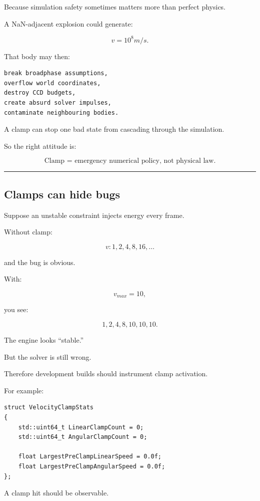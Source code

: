 Because simulation safety sometimes matters more than perfect physics.

A NaN-adjacent explosion could generate:

\[
v=10^8m/s.
\]

That body may then:

\begin{verbatim}
break broadphase assumptions,
overflow world coordinates,
destroy CCD budgets,
create absurd solver impulses,
contaminate neighbouring bodies.
\end{verbatim}

A clamp can stop one bad state from cascading through the simulation.

So the right attitude is:

\[
\boxed{
\text{Clamp = emergency numerical policy, not physical law.}
}
\]

\begin{center}\rule{0.5\linewidth}{0.5pt}\end{center}

\subsection{Clamps can hide bugs}\label{06-engine-ii-ch038-clamps-can-hide-bugs}

Suppose an unstable constraint injects energy every frame.

Without clamp:

\[
v:
1,2,4,8,16,\ldots
\]

and the bug is obvious.

With:

\[
v_{max}=10,
\]

you see:

\[
1,2,4,8,10,10,10.
\]

The engine looks ``stable.''

But the solver is still wrong.

Therefore development builds should instrument clamp activation.

For example:

\begin{verbatim}
struct VelocityClampStats
{
    std::uint64_t LinearClampCount = 0;
    std::uint64_t AngularClampCount = 0;

    float LargestPreClampLinearSpeed = 0.0f;
    float LargestPreClampAngularSpeed = 0.0f;
};
\end{verbatim}

A clamp hit should be observable.

